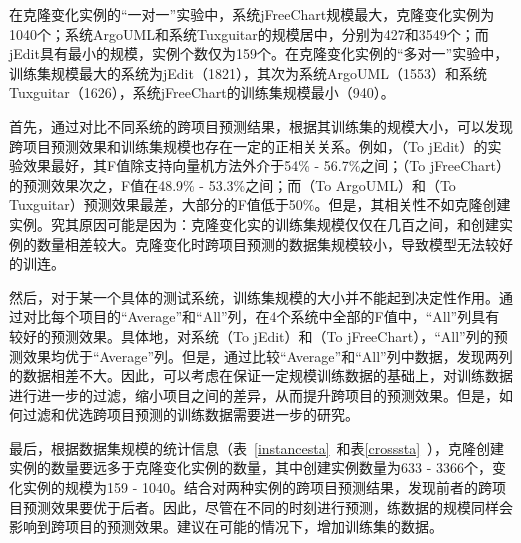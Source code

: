 在克隆变化实例的“一对一”实验中，系统jFreeChart规模最大，克隆变化实例为1040个；系统ArgoUML和系统Tuxguitar的规模居中，分别为427和3549个；而jEdit具有最小的规模，实例个数仅为159个。在克隆变化实例的“多对一”实验中，训练集规模最大的系统为jEdit（1821），其次为系统ArgoUML（1553）和系统Tuxguitar（1626），系统jFreeChart的训练集规模最小（940）。

首先，通过对比不同系统的跨项目预测结果，根据其训练集的规模大小，可以发现跨项目预测效果和训练集规模也存在一定的正相关关系。例如，（To jEdit）的实验效果最好，其F值除支持向量机方法外介于54\% - 56.7\%之间；（To jFreeChart）的预测效果次之，F值在48.9\% - 53.3\%之间；而（To ArgoUML）和（To Tuxguitar）预测效果最差，大部分的F值低于50\%。但是，其相关性不如克隆创建实例。究其原因可能是因为：克隆变化实的训练集规模仅仅在几百之间，和创建实例的数量相差较大。克隆变化时跨项目预测的数据集规模较小，导致模型无法较好的训连。

然后，对于某一个具体的测试系统，训练集规模的大小并不能起到决定性作用。通过对比每个项目的“Average”和“All”列，在4个系统中全部的F值中，“All”列具有较好的预测效果。具体地，对系统（To jEdit）和（To jFreeChart），“All”列的预测效果均优于“Average”列。但是，通过比较“Average”和“All”列中数据，发现两列的数据相差不大。因此，可以考虑在保证一定规模训练数据的基础上，对训练数据进行进一步的过滤，缩小项目之间的差异，从而提升跨项目的预测效果。但是，如何过滤和优选跨项目预测的训练数据需要进一步的研究。

最后，根据数据集规模的统计信息（表~\ref{instancesta}~和表\ref{crosssta}~），克隆创建实例的数量要远多于克隆变化实例的数量，其中创建实例数量为633 - 3366个，变化实例的规模为159 - 1040。结合对两种实例的跨项目预测结果，发现前者的跨项目预测效果要优于后者。因此，尽管在不同的时刻进行预测，练数据的规模同样会影响到跨项目的预测效果。建议在可能的情况下，增加训练集的数据。

